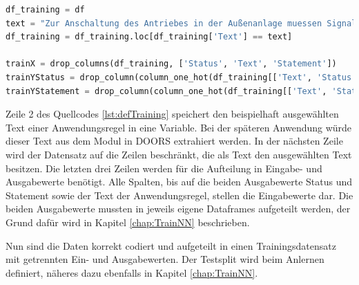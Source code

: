 \begin{lstlisting}[language = python, caption={Definieren des Trainingsdatensatzes},captionpos=b, label = lst:defTraining, floatplacement=H]
df_training = df
text = "Zur Anschaltung des Antriebes in der Außenanlage muessen Signalkabel nach VDE 0816/2 oder Kabel mit vergleichbaren Eigenschaften verwendet werden. Die Verlegevorschriften des Kabels sind einzuhalten."
df_training = df_training.loc[df_training['Text'] == text]

trainX = drop_columns(df_training, ['Status', 'Text', 'Statement'])
trainYStatus = drop_column(column_one_hot(df_training[['Text', 'Status']], ['Status']), "Text")
trainYStatement = drop_column(column_one_hot(df_training[['Text', 'Statement']], ['Statement']), "Text")
\end{lstlisting}

Zeile 2 des Quellcodes \ref*{lst:defTraining} speichert den beispielhaft ausgewählten Text einer Anwendungsregel in eine Variable. Bei der späteren Anwendung würde dieser Text
aus dem Modul in \ac{DOORS} extrahiert werden. In der nächsten Zeile wird der Datensatz auf die Zeilen beschränkt, die als Text den ausgewählten Text besitzen.
Die letzten drei Zeilen werden für die Aufteilung in Eingabe- und Ausgabewerte benötigt. Alle Spalten, bis auf die beiden Ausgabewerte \glqq Status\grqq{} und 
\glqq Statement\grqq{} sowie der Text der Anwendungsregel, stellen die Eingabewerte dar. Die beiden Ausgabewerte mussten in jeweils eigene Dataframes aufgeteilt werden, 
der Grund dafür wird in Kapitel \ref*{chap:TrainNN} beschrieben.

Nun sind die Daten korrekt codiert und aufgeteilt in einen Trainingsdatensatz mit getrennten Ein- und Ausgabewerten. Der Testsplit wird beim Anlernen definiert, näheres dazu ebenfalls in 
Kapitel \ref*{chap:TrainNN}.